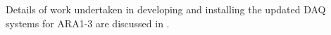 Details of work undertaken in developing and installing the updated DAQ systems for ARA1-3 are discussed in .

%
%





